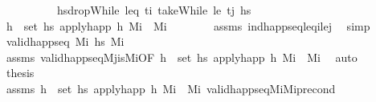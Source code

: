 \begin{isabellebody}
%
\isadelimproof
\ \ %
\endisadelimproof
%
\isatagproof
{}\isamarkupfalse%
\ {\isacharminus}{\kern0pt}\isanewline
\ \ \ \ \isamarkupfalse%
\ {\isacharquery}{\kern0pt}hs{\isacharprime}{\kern0pt}{\isacharequal}{\kern0pt}{\isachardoublequoteopen}dropWhile\ {\isacharparenleft}{\kern0pt}leq\ t\isactrlsub i{\isacharparenright}{\kern0pt}\ {\isacharparenleft}{\kern0pt}takeWhile\ {\isacharparenleft}{\kern0pt}le\ t\isactrlsub j{\isacharparenright}{\kern0pt}\ hs{\isacharparenright}{\kern0pt}{\isachardoublequoteclose}\isanewline
\ \ \ \ \isamarkupfalse%
\ {\isachardoublequoteopen}{\isasymforall}h\ {\isasymin}\ set\ {\isacharquery}{\kern0pt}hs{\isacharprime}{\kern0pt}{\isachardot}{\kern0pt}\ apply{\isacharunderscore}{\kern0pt}happ\ h\ M\isactrlsub i\ {\isacharequal}{\kern0pt}\ M\isactrlsub i{\isachardoublequoteclose}\isanewline
\ \ \ \ \ \ \isamarkupfalse%
\ assms\ ind{\isacharunderscore}{\kern0pt}happ{\isacharunderscore}{\kern0pt}seq{\isacharunderscore}{\kern0pt}leq\isactrlsub i{\isacharunderscore}{\kern0pt}le\isactrlsub j\ \isamarkupfalse%
\ simp\isanewline
\ \ \ \ \isamarkupfalse%
\ {\isachardoublequoteopen}valid{\isacharunderscore}{\kern0pt}happ{\isacharunderscore}{\kern0pt}seq\ M\isactrlsub i\ {\isacharquery}{\kern0pt}hs{\isacharprime}{\kern0pt}\ M\isactrlsub i{\isachardoublequoteclose}\isanewline
\ \ \ \ \ \ \isamarkupfalse%
\ assms\ valid{\isacharunderscore}{\kern0pt}happ{\isacharunderscore}{\kern0pt}seq{\isacharunderscore}{\kern0pt}M\isactrlsub j{\isacharunderscore}{\kern0pt}is{\isacharunderscore}{\kern0pt}M\isactrlsub i{\isacharbrackleft}{\kern0pt}OF\ {\isacartoucheopen}{\isasymforall}h\ {\isasymin}\ set\ {\isacharquery}{\kern0pt}hs{\isacharprime}{\kern0pt}{\isachardot}{\kern0pt}\ apply{\isacharunderscore}{\kern0pt}happ\ h\ M\isactrlsub i\ {\isacharequal}{\kern0pt}\ M\isactrlsub i{\isacartoucheclose}{\isacharbrackright}{\kern0pt}\ \isamarkupfalse%
\ auto\isanewline
\ \ \ \ \isamarkupfalse%
\ \isamarkupfalse%
\ {\isacharquery}{\kern0pt}thesis\isanewline
\ \ \ \ \ \ \isamarkupfalse%
\ assms\ {\isacartoucheopen}{\isasymforall}h\ {\isasymin}\ set\ {\isacharquery}{\kern0pt}hs{\isacharprime}{\kern0pt}{\isachardot}{\kern0pt}\ apply{\isacharunderscore}{\kern0pt}happ\ h\ M\isactrlsub i\ {\isacharequal}{\kern0pt}\ M\isactrlsub i{\isacartoucheclose}\ valid{\isacharunderscore}{\kern0pt}happ{\isacharunderscore}{\kern0pt}seq{\isacharunderscore}{\kern0pt}M\isactrlsub i{\isacharunderscore}{\kern0pt}M\isactrlsub i{\isacharunderscore}{\kern0pt}precond\ \isamarkupfalse%

\end{isabellebody}

